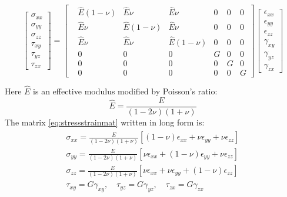 \begin{equation}
\begin{bmatrix}
\sigma_{xx}\\ 
\sigma_{yy}\\ 
\sigma_{zz}\\ 
\tau_{xy}\\ 
\tau_{yz}\\
\tau_{zx} 
\end{bmatrix}
=
\begin{bmatrix}
 &\hat{E}(1-\nu)  &\hat{E}\nu  &\hat{E}\nu  &0  &0  &0 \\ 
 &\hat{E}\nu  &\hat{E}(1-\nu)  &\hat{E}\nu  &0  &0 &0 \\ 
 &\hat{E}\nu  &\hat{E}\nu  &\hat{E}(1-\nu)  &0  &0 &0 \\ 
 &0  &0  &0  &G  &0 &0 \\
 &0  &0  &0  &0  &G &0 \\ 
 &0  &0  &0  &0  &0 &G
\end{bmatrix}
\begin{bmatrix}
\epsilon_{xx}\\ 
\epsilon_{yy}\\ 
\epsilon_{zz}\\ 
\gamma_{xy}\\ 
\gamma_{yz}\\
\gamma_{zx} 
\end{bmatrix}
\label{eq:stressstrainmat}
\end{equation}

Here $\hat{E}$ is an effective modulus modified by Poisson's ratio:
\begin{equation}
\hat{E} = \frac{E}{(1-2\nu)(1+\nu)}
\end{equation}
The matrix \ref{eq:stressstrainmat} written in long form is:
\begin{align}
\begin{split}
\sigma_{xx} = \frac{E}{(1-2\nu)(1+\nu)}[(1-\nu)\epsilon_{xx} + \nu\epsilon_{yy}+\nu\epsilon_{zz}] \\
\sigma_{yy} = \frac{E}{(1-2\nu)(1+\nu)}[\nu\epsilon_{xx} + (1-\nu)\epsilon_{yy}+\nu\epsilon_{zz}] \\
\sigma_{zz} = \frac{E}{(1-2\nu)(1+\nu)}[\nu\epsilon_{xx} + \nu\epsilon_{yy}+(1-\nu)\epsilon_{zz}] \\
\tau_{xy} = G\gamma_{xy}, \quad \tau_{yz} = G\gamma_{yz}, \quad \tau_{zx} = G\gamma_{zx}
\end{split}
\end{align}



